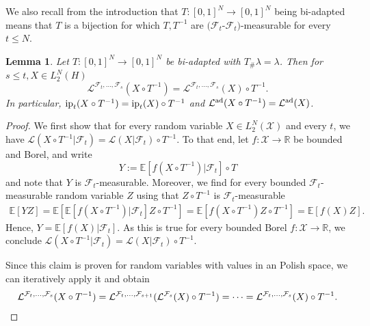 \documentclass[a4paper]{amsart}
\numberwithin{theorem}{section}
\newtheorem{lemma}[theorem]{Lemma}
\theoremstyle{definition}
\newcommand{\R}{\mathbb{R}}
\newcommand{\Xs}{\mathcal X}
\newcommand{\E}{\mathbb{E}}
\newcommand{\F}{\mathcal{F}}
\newcommand{\law}{\mathcal{L}}
\newcommand{\ip}{\textup{ip}}
\newcommand{\lawad}{\law^{\textup{ad}}}
\begin{document}
We also recall from the introduction that $T:[0,1]^N\to [0,1]^N$ being bi-adapted means that $T$ is a bijection for which $T, T^{-1}$ are $(\F_t$-$\F_t)$-measurable for every $t\leq N$.
\begin{lemma}\label{lem:iso_pres_ip}
Let  $T: [0,1]^N\to [0,1]^N $ be bi-adapted with $T_{\#}\lambda= \lambda$. Then for $s\le t, X\in L_2^N(H)$
$$\law^{\F_t,\dots, \F_s}(X \circ T^{-1}) = \law^{\F_t, \dots, \F_s}(X) \circ T^{-1} .$$ 
In particular,  $\ip_t(X \circ T^{-1}) = \ip_t(X) \circ T^{-1}$ and $\lawad(X \circ T^{-1}) = \lawad(X)$.
\end{lemma}
\begin{proof}
We first show that for every random variable $X \in L_2^N( \Xs)$ and every $t$, we have $\law(X \circ T^{-1} |\F_t) = \law(X |\F_t) \circ T^{-1}$.  To that end, let $f : \Xs \to \R$ be bounded and Borel, and write 
$$
Y := \E[f(X \circ T^{-1}) | \F_t] \circ T
$$
and note that $Y$ is $\F_t$-measurable. Moreover, we find for every bounded $\F_t$-measurable random variable $Z$ using that $Z \circ T^{-1}$ is $\F_t$-measurable
\begin{align*}
    \E[Y Z] = \E[ \E[f(X \circ T^{-1}) | \F_t]  Z \circ T^{-1}  ] = \E[ f(X \circ T^{-1}) Z \circ T^{-1} ] = \E[ f(X) Z ].
\end{align*}
Hence, $Y = \E[f(X)|\F_t]$. 
As this is true for every bounded Borel $f : \Xs \to \R$, we conclude $\law(X \circ T^{-1} | \F_t) = \law(X |\F_t) \circ T^{-1}$.

Since this claim is proven for random variables with values in an  Polish space, we can iteratively apply it and obtain
\[
\law^{\F_t,\dots, \F_s}(X \circ T^{-1}) =   \law^{\F_t,\dots, \F_{s+1}}( \law^{\F_s}(X) \circ T^{-1}) =     \cdots = \law^{\F_t, \dots, \F_s}(X) \circ T^{-1}. \qedhere
\]
\end{proof}
\end{document}
